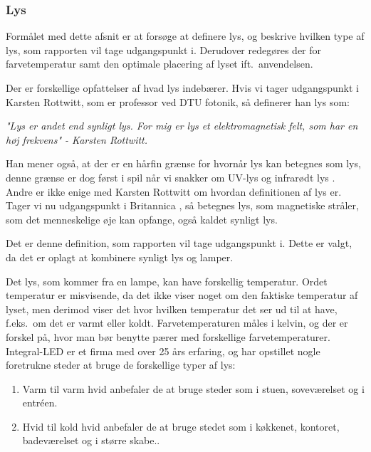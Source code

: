 \subsubsection{Lys}
\label{sec:lys}
Formålet med dette afsnit er at forsøge at definere lys, og beskrive hvilken type af lys, som rapporten vil tage udgangspunkt i. Derudover redegøres der for farvetemperatur samt den optimale placering af lyset ift.\ anvendelsen.


Der er forskellige opfattelser af hvad lys indebærer. Hvis vi tager udgangspunkt i Karsten Rottwitt, som er professor ved DTU fotonik, så definerer han lys som:


\textit{"Lys er andet end synligt lys. For mig er lys et elektromagnetisk felt, som har en høj frekvens"
- Karsten Rottwitt\cite{def_lys}.}

Han mener også, at der er en hårfin grænse for hvornår lys kan betegnes som lys, denne grænse er dog først i spil når vi snakker om UV-lys og infrarødt lys \cite{def_lys}. 
Andre er ikke enige med Karsten Rottwitt om hvordan definitionen af lys er. Tager vi nu udgangspunkt i Britannica \cite{britannica_lys}, så betegnes lys, som magnetiske stråler, som det menneskelige øje kan opfange, også kaldet synligt lys. 


Det er denne definition, som rapporten vil tage udgangspunkt i. Dette er valgt, da det er oplagt at kombinere synligt lys og lamper.

Det lys, som kommer fra en lampe, kan have forskellig temperatur. Ordet temperatur er misvisende, da det ikke viser noget om den faktiske temperatur af lyset, men derimod viser det hvor hvilken temperatur det ser ud til at have, f.eks.\ om det er varmt eller koldt. Farvetemperaturen måles i kelvin, og der er forskel på, hvor man bør benytte pærer med forskellige farvetemperaturer. Integral-LED er et firma med over 25 års erfaring\cite{integral_led}, og har opstillet nogle foretrukne steder at bruge de forskellige typer af lys:

\begin{enumerate}
\item Varm til varm hvid anbefaler de at bruge steder som i stuen, soveværelset og i entréen.
\item Hvid til kold hvid anbefaler de at bruge stedet som i køkkenet, kontoret, badeværelset og i større skabe.\cite{varm_kold}.
\end{enumerate}
